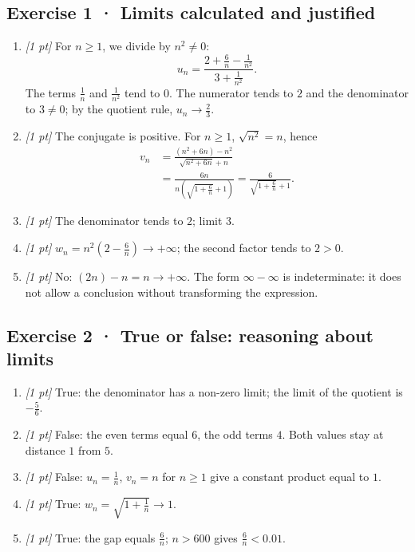 \subsection*{Exercise 1 · Limits calculated and justified}\begin{enumerate}

\item \textit{[1 pt]} For $n\ge1$, we divide by $n^2\ne0$:
\[u_n=\frac{2+\frac{6}{n}-\frac{1}{n^2}}{3+\frac{1}{n^2}}.\]
The terms $\frac{1}{n}$ and $\frac{1}{n^2}$ tend to $0$. The numerator tends to $2$ and the denominator to $3\ne0$; by the quotient rule, $u_n\to\frac{2}{3}$.

\item \textit{[1 pt]} The conjugate is positive. For $n\ge1$, $\sqrt{n^2}=n$, hence
\[\begin{aligned}v_n&=\frac{(n^2+6n)-n^2}{\sqrt{n^2+6n}+n}\\&=\frac{6n}{n(\sqrt{1+\frac{6}{n}}+1)}=\frac{6}{\sqrt{1+\frac{6}{n}}+1}.\end{aligned}\]

\item \textit{[1 pt]} The denominator tends to $2$; limit $3$.

\item \textit{[1 pt]} $w_n=n^2(2-\frac{6}{n})\to+\infty$; the second factor tends to $2>0$.

\item \textit{[1 pt]} No: $(2n)-n=n\to+\infty$. The form $\infty-\infty$ is indeterminate: it does not allow a conclusion without transforming the expression.

\end{enumerate}

\subsection*{Exercise 2 · True or false: reasoning about limits}\begin{enumerate}

\item \textit{[1 pt]} True: the denominator has a non-zero limit; the limit of the quotient is $-\frac{5}{6}$.

\item \textit{[1 pt]} False: the even terms equal $6$, the odd terms $4$. Both values stay at distance $1$ from $5$.

\item \textit{[1 pt]} False: $u_n=\frac{1}{n}$, $v_n=n$ for $n\ge1$ give a constant product equal to $1$.

\item \textit{[1 pt]} True: $w_n=\sqrt{1+\frac{1}{n}}\to1$.

\item \textit{[1 pt]} True: the gap equals $\frac{6}{n}$; $n>600$ gives $\frac{6}{n}<\num{0,01}$.

\end{enumerate}

